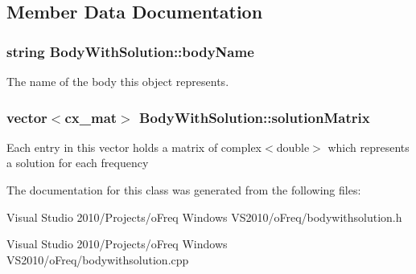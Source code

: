 \subsection{Member Data Documentation}
\hypertarget{class_body_with_solution_ad7d65251341438956aba237632a65850}{
\subsubsection[{body\-Name}]{\setlength{\rightskip}{0pt plus 5cm}string Body\-With\-Solution\-::body\-Name}}\label{class_body_with_solution_ad7d65251341438956aba237632a65850}
The name of the body this object represents. \hypertarget{class_body_with_solution_ab137fb3c24fe281c9375146d2e170667}{
\subsubsection[{solution\-Matrix}]{\setlength{\rightskip}{0pt plus 5cm}vector$<$cx\-\_\-mat$>$ Body\-With\-Solution\-::solution\-Matrix}}\label{class_body_with_solution_ab137fb3c24fe281c9375146d2e170667}
Each entry in this vector holds a matrix of complex$<$double$>$ which represents a solution for each frequency 

The documentation for this class was generated from the following files\-:\begin{DoxyCompactItemize}
\item 
Visual Studio 2010/\-Projects/o\-Freq Windows V\-S2010/o\-Freq/bodywithsolution.\-h\item 
Visual Studio 2010/\-Projects/o\-Freq Windows V\-S2010/o\-Freq/bodywithsolution.\-cpp\end{DoxyCompactItemize}
